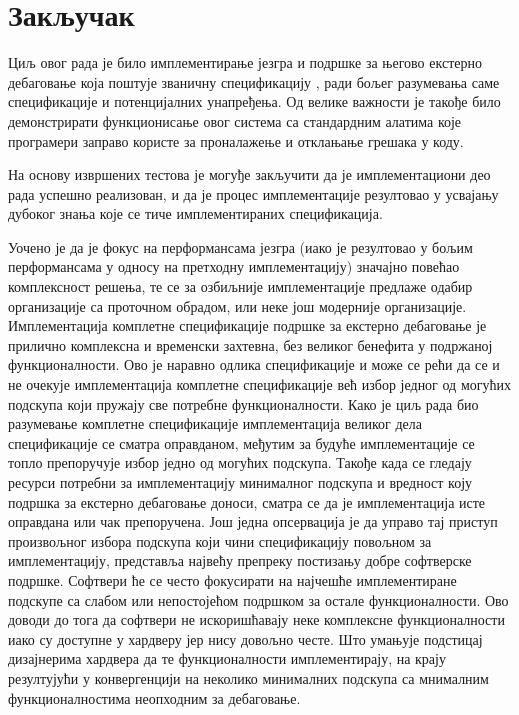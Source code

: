 \chapter{Закључак}

Циљ овог рада је било имплементирање  језгра и подршке за његово екстерно дебаговање која поштује званичну спецификацију \cite{debug_spec}, ради бољег разумевања саме спецификације и потенцијалних унапређења. Од велике важности је такође било демонстрирати функционисање овог система са стандардним алатима које програмери заправо користе за проналажење и отклањање грешака у коду.

На основу извршених тестова је могуђе закључити да је имплементациони део рада успешно реализован, и да је процес имплементације резултовао у усвајању дубоког знања које се тиче имплементираних спецификација.

Уочено је да је фокус на перформансама језгра (иако је резултовао у бољим перформансама у односу на претходну имплементацију) значајно повећао комплексност решења, те се за озбиљније имплементације предлаже одабир организације са проточном обрадом, или неке још модерније организације.
Имплементација комплетне спецификације подршке за екстерно дебаговање је прилично комплексна и временски захтевна, без великог бенефита у подржаној функционалности. Ово је наравно одлика спецификације и може се рећи да се и не очекује имплементација комплетне спецификације већ избор једног од могућих подскупа који пружају све потребне функционалности. Како је циљ рада био разумевање комплетне спецификације имплементација великог дела спецификације се сматра оправданом, међутим за будуће имплементације се топло препоручује избор једно од могућих подскупа. Такође када се гледају ресурси потребни за имплементацију минималног подскупа и вредност коју подршка за екстерно дебаговање доноси, сматра се да је имплементација исте оправдана или чак препоручена. Још једна опсервација је да управо тај приступ произвољног избора подскупа који чини спецификацију повољном за имплементацију, представља највећу препреку постизању добре софтверске подршке. Софтвери ће се често фокусирати на најчешће имплементиране подскупе са слабом или непостојећом подршком за остале функционалности. Ово доводи до тога да софтвери не искоришћавају неке комплексне функционалности иако су доступне у хардверу јер нису довољно честе. Што умањује подстицај дизајнерима хардвера да те функционалности имплементирају, на крају резултујући у конвергенцији на неколико минималних подскупа са мнималним функционалностима неопходним за дебаговање.


